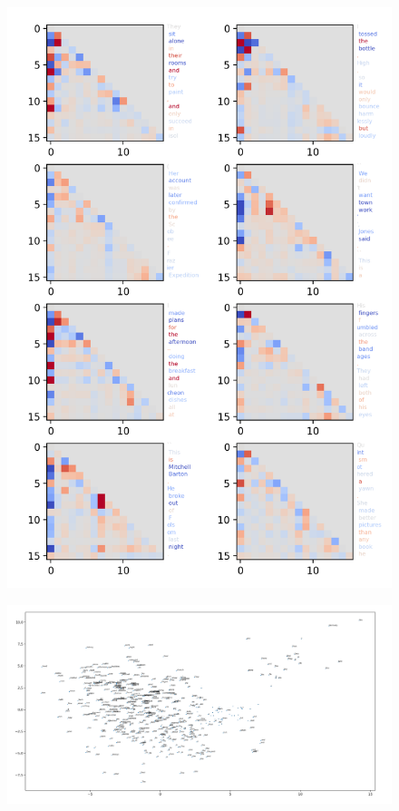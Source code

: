 \documentclass{article}
\begin{document}
\begin{figure}
    \includegraphics[width=\textwidth]{images/pca-component-2.png}
\end{figure}

\begin{figure}
    \includegraphics[width=\textwidth]{images/attending-to-first-token.png}
\end{figure}
\end{document}
